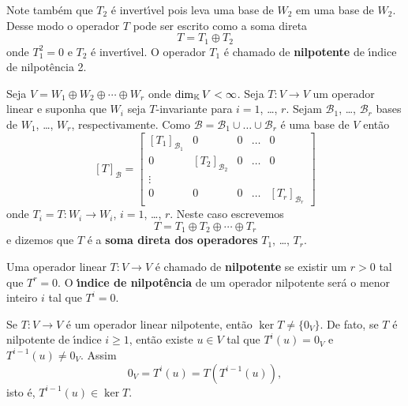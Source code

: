 Note tamb\'em que $T_2$ \'e invert{\'\i}vel pois leva uma base de $W_2$ em uma base de $W_2$. Desse modo o operador $T$ pode ser escrito como a soma direta
\[
	T = T_1 \oplus T_2
\]
onde $T_1^2 = 0$ e $T_2$ \'e invert{\'\i}vel. O operador $T_1$ \'e chamado de \textbf{nilpotente} de {\'\i}ndice de nilpot\^encia 2.

\begin{definicao}
	Seja $V = W_1 \oplus W_2 \oplus \cdots \oplus W_r$ onde $\dim_{\mathbb{K}} V < \infty$. Seja $T : V \to V$ um operador linear e suponha que $W_i$ seja $T$-invariante para $i = 1$, \dots, $r$. Sejam $\mathcal{B}_1$, \dots, $\mathcal{B}_r$ bases de $W_1$, \dots, $W_r$, respectivamente. Como $\mathcal{B} = \mathcal{B}_1 \cup \dots \cup \mathcal{B}_r $ \'e uma base de $V$ ent\~ao
	\[
		[T]_\mathcal{B} = \begin{bmatrix}
		[T_1]_{\mathcal{B}_1} & 0 & 0 & \dots & 0\\
		0 & [T_2]_{\mathcal{B}_2} & 0 & \dots & 0\\
		\vdots\\
		0 & 0 & 0 & \dots & [T_r]_{\mathcal{B}_r}
	\end{bmatrix}
	\]
	onde $T_i = T : W_i \to W_i$, $i = 1$, \dots, $r$. Neste caso escrevemos
	\[
		T = T_1 \oplus T_2 \oplus \cdots \oplus T_r
	\]
	e dizemos que $T$ \'e a \textbf{soma direta dos operadores} $T_1$, \dots, $T_r$.
\end{definicao}

\begin{definicao}
	Uma operador linear $T : V \to V$ \'e chamado de \textbf{nilpotente} se existir um $r > 0$ tal que $T^r = 0$. O \textbf{{\'\i}ndice de nilpot\^encia} de um operador nilpotente ser\'a o menor inteiro $i$ tal que $T^i = 0$.
\end{definicao}

\begin{observacao}
	Se $T : V \to V$ \'e um operador linear nilpotente, ent\~ao $\ker T \ne \{0_V\}$. De fato, se $T$ \'e nilpotente de {\'\i}ndice $i \ge 1$, ent\~ao existe $u \in V$ tal que $T^i(u) = 0_V$ e $T^{i - 1}(u) \ne 0_V$. Assim
	\[
		0_V = T^i(u) = T(T^{i - 1}(u)),
	\]
	isto \'e, $T^{i - 1}(u) \in \ker T$.
\end{observacao}

